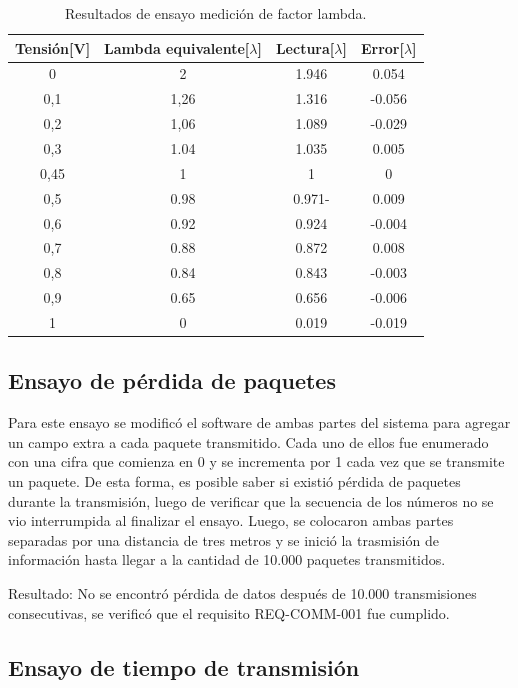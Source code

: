 \begin{table}[htpb]
	\centering
	\caption{Resultados de ensayo medición de factor lambda.}
	\centering
	\begin{tabular}{c c c c}    
		\toprule
		\textbf{Tensión[V]} & \textbf{Lambda equivalente[$\lambda$]} & \textbf{Lectura[$\lambda$]} & \textbf{Error[$\lambda$]} \\
		\midrule
		0		&	2	 & 1.946 & 0.054 \\		
		0,1		&   1,26 & 1.316 & -0.056 \\
		0,2		&   1,06 & 1.089 & -0.029 \\
		0,3		&   1.04 & 1.035 & 0.005 \\
		0,45	&   1 	 & 1 	 & 0 \\
		0,5		&   0.98 & 0.971- & 0.009 \\
		0,6		&   0.92 & 0.924 & -0.004 \\
		0,7		&   0.88 & 0.872 & 0.008 \\
		0,8		&   0.84 & 0.843 & -0.003 \\
		0,9		&   0.65 & 0.656 & -0.006 \\
		1		&   0	 & 0.019 & -0.019 \\
		\bottomrule
	\end{tabular}
	\label{tab:ensayo-o2}
\end{table}

\subsection{Ensayo de pérdida de paquetes}

Para este ensayo se modificó el software de ambas partes del sistema para agregar un campo extra a cada paquete transmitido. Cada uno de ellos fue enumerado con una cifra que comienza en 0 y se incrementa por 1 cada vez que se transmite un paquete. De esta forma, es posible saber si existió pérdida de paquetes durante la transmisión, luego de verificar que la secuencia de los números no se vio interrumpida al finalizar el ensayo. Luego, se colocaron ambas partes separadas por una distancia de tres metros y se inició la trasmisión de información hasta llegar a la cantidad de 10.000 paquetes transmitidos.

Resultado: No se encontró pérdida de datos después de 10.000 transmisiones consecutivas, se verificó que el requisito REQ-COMM-001 fue cumplido.

\subsection{Ensayo de tiempo de transmisión}

